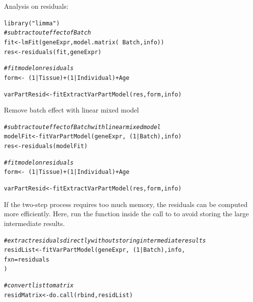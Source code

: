 \documentclass[12pt]{article}\usepackage[]{graphicx}\usepackage[]{xcolor}
\newcommand{\hlnum}[1]{\textcolor[rgb]{0.816,0.125,0.439}{#1}}%
\newcommand{\hlstr}[1]{\textcolor[rgb]{0.251,0.627,0.251}{#1}}%
\newcommand{\hlcom}[1]{\textcolor[rgb]{0.502,0.502,0.502}{\textit{#1}}}%
\newcommand{\hlopt}[1]{\textcolor[rgb]{0,0,0}{#1}}%
\newcommand{\hlstd}[1]{\textcolor[rgb]{0.251,0.251,0.251}{#1}}%
\newcommand{\hlkwb}[1]{\textcolor[rgb]{0,0,0}{#1}}%
\newcommand{\hlkwc}[1]{\textcolor[rgb]{0.251,0.251,0.251}{#1}}%
\newcommand{\hlkwd}[1]{\textcolor[rgb]{0.878,0.439,0.125}{#1}}%
\newenvironment{knitrout}{}{} %
\begin{document}
Analysis on residuals:
\begin{knitrout}
\color{fgcolor}\begin{kframe}
\begin{alltt}
\hlkwd{library}\hlstd{(}\hlstr{"limma"}\hlstd{)}
\hlcom{# subtract out effect of Batch}
\hlstd{fit} \hlkwb{<-} \hlkwd{lmFit}\hlstd{(geneExpr,} \hlkwd{model.matrix}\hlstd{(}\hlopt{~}\hlstd{Batch, info))}
\hlstd{res} \hlkwb{<-} \hlkwd{residuals}\hlstd{(fit, geneExpr)}

\hlcom{# fit model on residuals}
\hlstd{form} \hlkwb{<-} \hlopt{~} \hlstd{(}\hlnum{1} \hlopt{|} \hlstd{Tissue)} \hlopt{+} \hlstd{(}\hlnum{1} \hlopt{|} \hlstd{Individual)} \hlopt{+} \hlstd{Age}

\hlstd{varPartResid} \hlkwb{<-} \hlkwd{fitExtractVarPartModel}\hlstd{(res, form, info)}
\end{alltt}
\end{kframe}
\end{knitrout}

Remove batch effect with linear mixed model
\begin{knitrout}
\color{fgcolor}\begin{kframe}
\begin{alltt}
\hlcom{# subtract out effect of Batch with linear mixed model}
\hlstd{modelFit} \hlkwb{<-} \hlkwd{fitVarPartModel}\hlstd{(geneExpr,} \hlopt{~} \hlstd{(}\hlnum{1} \hlopt{|} \hlstd{Batch), info)}
\hlstd{res} \hlkwb{<-} \hlkwd{residuals}\hlstd{(modelFit)}

\hlcom{# fit model on residuals}
\hlstd{form} \hlkwb{<-} \hlopt{~} \hlstd{(}\hlnum{1} \hlopt{|} \hlstd{Tissue)} \hlopt{+} \hlstd{(}\hlnum{1} \hlopt{|} \hlstd{Individual)} \hlopt{+} \hlstd{Age}

\hlstd{varPartResid} \hlkwb{<-} \hlkwd{fitExtractVarPartModel}\hlstd{(res, form, info)}
\end{alltt}
\end{kframe}
\end{knitrout}

If the two-step process requires too much memory, the residuals can be computed more efficiently.  Here, run the  function inside the call to  to avoid storing the large intermediate results.
\begin{knitrout}
\color{fgcolor}\begin{kframe}
\begin{alltt}
\hlcom{# extract residuals directly without storing intermediate results}
\hlstd{residList} \hlkwb{<-} \hlkwd{fitVarPartModel}\hlstd{(geneExpr,} \hlopt{~} \hlstd{(}\hlnum{1} \hlopt{|} \hlstd{Batch), info,}
  \hlkwc{fxn} \hlstd{= residuals}
\hlstd{)}

\hlcom{# convert list to matrix}
\hlstd{residMatrix} \hlkwb{<-} \hlkwd{do.call}\hlstd{(rbind, residList)}
\end{alltt}
\end{kframe}
\end{knitrout}
\end{document}
